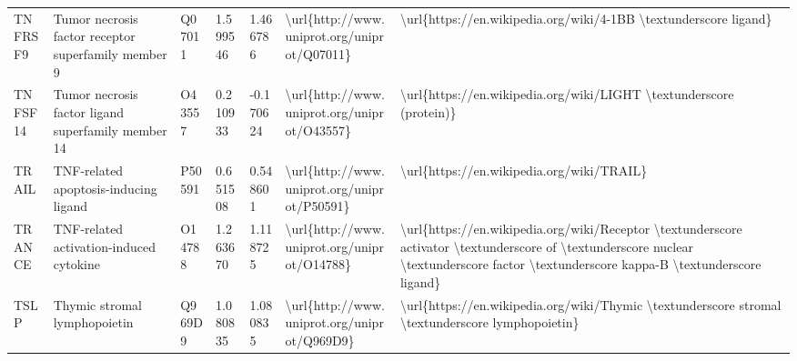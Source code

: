 \begin{table}[]
\begin{tabular}{lllllll}
\multicolumn{1}{l|}{TNFRSF9}  & Tumor necrosis factor receptor superfamily member 9           & Q07011  & 1.599546           & 1.466786          & \textbackslash{}url\{http://www.uniprot.org/uniprot/Q07011\} & \textbackslash{}url\{https://en.wikipedia.org/wiki/4-1BB \textbackslash{}textunderscore ligand\}                                                                                                                                                                                                   \\
\multicolumn{1}{l|}{TNFSF14}  & Tumor necrosis factor ligand superfamily member 14            & O43557  & 0.210933           & -0.170624         & \textbackslash{}url\{http://www.uniprot.org/uniprot/O43557\} & \textbackslash{}url\{https://en.wikipedia.org/wiki/LIGHT \textbackslash{}textunderscore (protein)\}                                                                                                                                                                                                \\
\multicolumn{1}{l|}{TRAIL}    & TNF-related apoptosis-inducing ligand                         & P50591  & 0.651508           & 0.548601          & \textbackslash{}url\{http://www.uniprot.org/uniprot/P50591\} & \textbackslash{}url\{https://en.wikipedia.org/wiki/TRAIL\}                                                                                                                                                                                                                                         \\
\multicolumn{1}{l|}{TRANCE}   & TNF-related activation-induced cytokine                       & O14788  & 1.263670           & 1.118725          & \textbackslash{}url\{http://www.uniprot.org/uniprot/O14788\} & \textbackslash{}url\{https://en.wikipedia.org/wiki/Receptor \textbackslash{}textunderscore activator \textbackslash{}textunderscore of \textbackslash{}textunderscore nuclear \textbackslash{}textunderscore factor \textbackslash{}textunderscore kappa-B \textbackslash{}textunderscore ligand\} \\
\multicolumn{1}{l|}{TSLP}     & Thymic stromal lymphopoietin                                  & Q969D9  & 1.080835           & 1.080835          & \textbackslash{}url\{http://www.uniprot.org/uniprot/Q969D9\} & \textbackslash{}url\{https://en.wikipedia.org/wiki/Thymic \textbackslash{}textunderscore stromal \textbackslash{}textunderscore lymphopoietin\}                                                                                                                                                    \\

\end{tabular}
\end{table}
